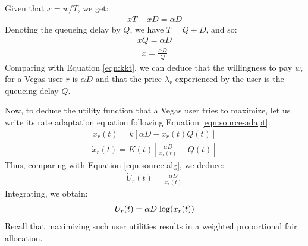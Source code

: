\documentclass{article}
\def\lg{{\rm log}}
\begin{document}
Given that $x = w/T$, we get:
\begin{eqnarray*}
x T - x D = \alpha D
\end{eqnarray*}
Denoting the queueing delay by $Q$, we have $T = Q + D$, and so: 
\begin{eqnarray*}
x Q = \alpha D
\end{eqnarray*}
\begin{eqnarray*}
x = \frac{\alpha D}{Q}
\end{eqnarray*}
Comparing with Equation \ref{eqn:kkt}, we can deduce that
the willingness to pay $w_r$ for a Vegas user $r$ is $\alpha D$
and that the price $\lambda_r$ experienced by the user is the queueing delay $Q$.

Now, to deduce the utility function that a Vegas user tries to maximize,
let us write its rate adaptation equation following Equation \ref{eqn:source-adapt}:
\begin{eqnarray*}
\dot{x}_r(t) = k [\alpha D - x_r(t) Q(t)]
\end{eqnarray*}
\begin{eqnarray*}
\dot{x}_r(t) = K(t) [\frac{\alpha D}{x_r(t)} - Q(t)]
\end{eqnarray*}
Thus, comparing with Equation \ref{eqn:source-alg}, we deduce:
\begin{eqnarray*}
\dot{U}_r(t) = \frac{\alpha D}{x_r(t)} 
\end{eqnarray*}
Integrating, we obtain:
\begin{eqnarray*}
U_r(t) = \alpha D \; \lg(x_r(t)) 
\end{eqnarray*}
Recall that maximizing such user utilities results in a weighted proportional fair allocation.
\end{document}
